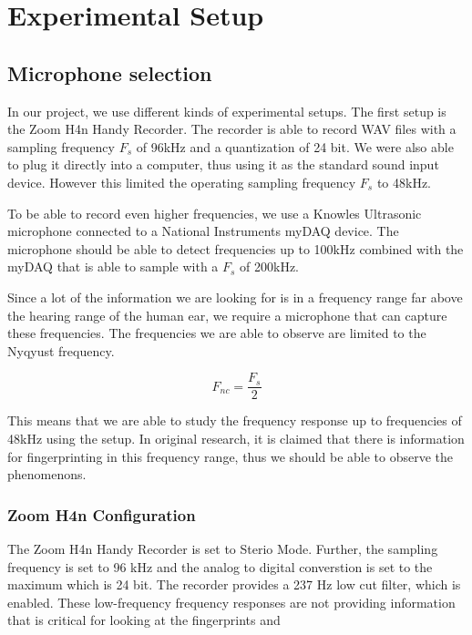 \chapter{Experimental Setup}
\label{chp:experimental_setup} 

\section{Microphone selection}\label{sec:ch3_microphone_selection}

In our project, we use different kinds of experimental setups. 
The first setup is the Zoom H4n Handy Recorder. 
The recorder is able to record WAV files with a sampling frequency \( {F_{s}} \) of 96kHz and a quantization of 24 bit. We were also able to plug it directly into a computer, thus using it as the standard sound input device. 
However this limited the operating sampling frequency \( {F_{s}} \) to 48kHz.

To be able to record even higher frequencies, we use a Knowles Ultrasonic microphone connected to a National Instruments myDAQ device. 
The microphone should be able to detect frequencies up to 100kHz combined with the myDAQ that is able to sample with a \( {F_{s}} \) of 200kHz.

Since a lot of the information we are looking for is in a frequency range far above the hearing range of the human ear, we require a microphone that can capture these frequencies. 
The frequencies we are able to observe are limited to the Nyqyust frequency.

\begin{equation}\label{eq:ch3_nyquist_frequency}
F_{nc} = \frac{F_{s}}{2}
\end{equation}

This means that we are able to study the frequency response up to frequencies of 48kHz using the setup.
In original research, it is claimed that there is information for fingerprinting in this frequency range, thus we should be able to observe the phenomenons.

\subsection{Zoom H4n Configuration}\label{sec:ch3_zoom_H4n_configuration}

The Zoom H4n Handy Recorder is set to Sterio Mode.
Further, the sampling frequency is set to 96 kHz and the analog to digital converstion is set to the maximum which is 24 bit.
The recorder provides a 237 Hz low cut filter, which is enabled.
These low-frequency frequency responses are not providing information that is critical for looking at the fingerprints and   

